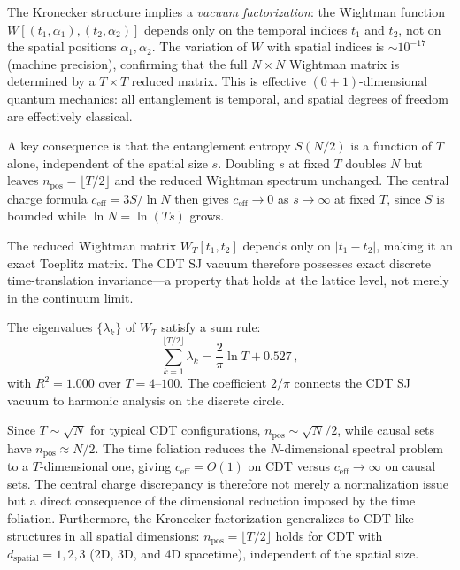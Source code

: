 \documentclass[aps,prd,twocolumn,superscriptaddress,nofootinbib]{revtex4-2}
\begin{document}
The Kronecker structure implies a \emph{vacuum factorization}: the Wightman function $W[(t_1, \alpha_1), (t_2, \alpha_2)]$ depends only on the temporal indices $t_1$ and $t_2$, not on the spatial positions $\alpha_1, \alpha_2$. The variation of $W$ with spatial indices is $\sim\!10^{-17}$ (machine precision), confirming that the full $N \times N$ Wightman matrix is determined by a $T \times T$ reduced matrix. This is effective $(0\!+\!1)$-dimensional quantum mechanics: all entanglement is temporal, and spatial degrees of freedom are effectively classical.

A key consequence is that the entanglement entropy $S(N/2)$ is a function of $T$ alone, independent of the spatial size $s$. Doubling $s$ at fixed $T$ doubles $N$ but leaves $n_{\mathrm{pos}} = \lfloor T/2 \rfloor$ and the reduced Wightman spectrum unchanged. The central charge formula $c_{\mathrm{eff}} = 3S/\ln N$ then gives $c_{\mathrm{eff}} \to 0$ as $s \to \infty$ at fixed $T$, since $S$ is bounded while $\ln N = \ln(Ts)$ grows.

The reduced Wightman matrix $W_T[t_1, t_2]$ depends only on $|t_1 - t_2|$, making it an exact Toeplitz matrix. The CDT SJ vacuum therefore possesses exact discrete time-translation invariance---a property that holds at the lattice level, not merely in the continuum limit.

The eigenvalues $\{\lambda_k\}$ of $W_T$ satisfy a sum rule:
\begin{equation}
\sum_{k=1}^{\lfloor T/2 \rfloor} \lambda_k = \frac{2}{\pi} \ln T + 0.527\,,
\end{equation}
with $R^2 = 1.000$ over $T = 4$--$100$. The coefficient $2/\pi$ connects the CDT SJ vacuum to harmonic analysis on the discrete circle.

Since $T \sim \sqrt{N}$ for typical CDT configurations, $n_{\mathrm{pos}} \sim \sqrt{N}/2$, while causal sets have $n_{\mathrm{pos}} \approx N/2$. The time foliation reduces the $N$-dimensional spectral problem to a $T$-dimensional one, giving $c_{\mathrm{eff}} = O(1)$ on CDT versus $c_{\mathrm{eff}} \to \infty$ on causal sets. The central charge discrepancy is therefore not merely a normalization issue but a direct consequence of the dimensional reduction imposed by the time foliation. Furthermore, the Kronecker factorization generalizes to CDT-like structures in all spatial dimensions: $n_{\mathrm{pos}} = \lfloor T/2 \rfloor$ holds for CDT with $d_{\mathrm{spatial}} = 1, 2, 3$ (2D, 3D, and 4D spacetime), independent of the spatial size.
\end{document}
